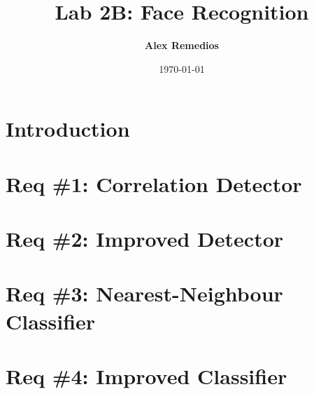 \documentclass[a4paper,12pt]{article}
\title{Lab 2B: Face Recognition}
\author{\textbf{Alex Remedios}}
\date{\today}
\begin{document}
\lstset{language=Matlab,breaklines,breakatwhitespace,basicstyle=\small}
\maketitle

\section{Introduction}
\citep{szeliski}

\section{Req \#1: Correlation Detector}


\section{Req \#2: Improved Detector}


\section{Req \#3: Nearest-Neighbour Classifier}


\section{Req \#4: Improved Classifier}





\appendix
\end{document}
